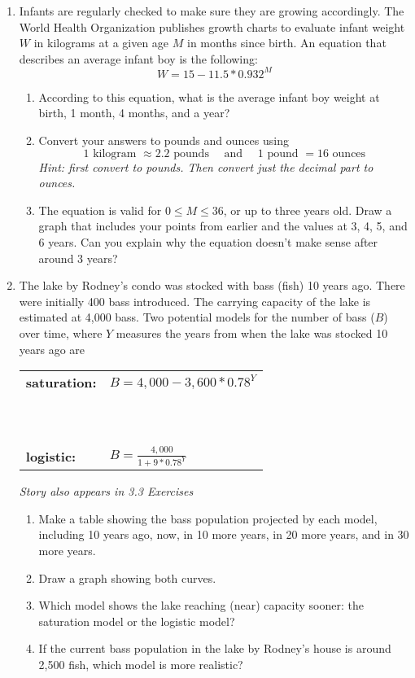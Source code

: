 \begin{enumerate}
\item Infants are regularly checked to make sure they are growing accordingly.  The World Health Organization publishes growth charts to evaluate infant weight $W$ in kilograms at a given age $M$ in months since birth.  An equation that describes an average infant boy is the following:
$$W=15-11.5\ast0.932^M$$
\begin{enumerate}
\item According to this equation, what is the average infant boy weight at birth, 1 month, 4 months, and a year?
\item Convert your answers to pounds and ounces using $$1 \text{ kilogram } \approx 2.2 \text{ pounds} \quad \text{ and } \quad 1 \text{ pound } = 16 \text{ ounces}$$
\emph{Hint:  first convert to pounds.  Then convert just the decimal part to ounces.}
\item The equation is valid for $0 \le M \le 36$, or up to three years old.  Draw a graph that includes your points from earlier and the values at 3, 4, 5, and 6 years.  Can you explain why the equation doesn't make sense after around 3 years?
\end{enumerate}  

\item The lake by Rodney's condo was stocked with bass (fish) 10 years ago.  There were initially 400 bass introduced.  The carrying capacity of the lake is estimated at 4,000 bass.  Two potential models for the number of bass ($B$) over time, where $Y$ measures the years from when the lake was stocked 10 years ago are

\vspace{.05in} %
\begin{center}
\begin{tabular} {ll} 
 \textbf{saturation:} & $B=4,000-3,600\ast0.78^Y$ \\ 
 \begin{tiny} ~ \end{tiny} \\
 \textbf{logistic:} & $\displaystyle B=\frac{4,000}{1+9 \ast 0.78^Y}$ \\
\end{tabular}
\end{center} 
\vspace{.05in} %

\hfill \emph{Story also appears in 3.3 Exercises}

\begin{enumerate}
\item Make a table showing the bass population projected by each model, including 10 years ago, now, in 10 more years, in 20 more years, and in 30 more years.
\item Draw a graph showing both curves.
\item Which model shows the lake reaching (near) capacity sooner:  the saturation model or the logistic model?
\item If the current bass population in the lake by Rodney's house is around 2,500 fish, which model is more realistic?
\end{enumerate}


\end{enumerate}




